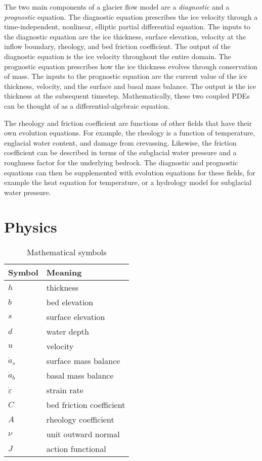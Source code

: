 \documentclass{article}
\theoremstyle{definition}
\theoremstyle{plain}
\begin{document}
The two main components of a glacier flow model are a \emph{diagnostic} and a \emph{prognostic} equation.
The diagnostic equation prescribes the ice velocity through a time-independent, nonlinear, elliptic partial differential equation.
The inputs to the diagnostic equation are the ice thickness, surface elevation, velocity at the inflow boundary, rheology, and bed friction coefficient.
The output of the diagnostic equation is the ice velocity throughout the entire domain.
The prognostic equation prescribes how the ice thickness evolves through conservation of mass.
The inputs to the prognostic equation are the current value of the ice thickness, velocity, and the surface and basal mass balance.
The output is the ice thickness at the subsequent timestep.
Mathematically, these two coupled PDEs can be thought of as a differential-algebraic equation.

The rheology and friction coefficient are functions of other fields that have their own evolution equations.
For example, the rheology is a function of temperature, englacial water content, and damage from crevassing.
Likewise, the friction coefficient can be described in terms of the subglacial water pressure and a roughness factor for the underlying bedrock.
The diagnostic and prognostic equations can then be supplemented with evolution equations for these fields, for example the heat equation for temperature, or a hydrology model for subglacial water pressure.


\section{Physics}

\begin{table}[h]
    \begin{tabular}{l|l}
        Symbol & Meaning \\
        \hline
        $h$ & thickness \\
        $b$ & bed elevation  \\
        $s$ & surface elevation  \\
        $d$ & water depth \\
        $u$ & velocity \\
        $\dot a_s$ & surface mass balance \\
        $\dot a_b$ & basal mass balance \\
        $\dot\varepsilon$ & strain rate \\
        $C$ & bed friction coefficient \\
        $A$ & rheology coefficient \\
        $\nu$ & unit outward normal \\
        $J$ & action functional
    \end{tabular}
    \caption{Mathematical symbols}
\end{table}
\end{document}
